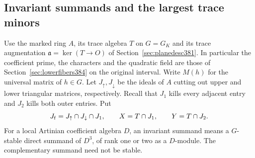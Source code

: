 \documentclass[a4paper,11pt]{article}
\theoremstyle{definition}
\theoremstyle{remark}
\numberwithin{equation}{section}
\begin{document}
\subsection{Invariant summands and the largest trace minors}
\label{sec:flagtraceideals385}

Use the marked ring \(A\), its trace algebra \(T\) on \(G=G_K\)
and its trace augmentation \(\mathfrak a=\ker(T\to O)\) of
Section~\ref{sec:planedesc381}. In particular the coefficient
prime, the characters and the quadratic field are those of
Section~\ref{sec:lowerfibers384} on the original interval.
Write \(M(h)\) for the universal matrix of \(h\in G\).
Let \(J_\uparrow,J_\downarrow\) be the ideals of \(A\) cutting
out upper and lower triangular matrices, respectively.
Recall that \(J_1\) kills every adjacent entry and \(J_2\)
kills both outer entries. Put
\[
 J_{\rm f}=J_\uparrow\cap J_\downarrow\cap J_1,\qquad
 X=T\cap J_1,\qquad Y=T\cap J_2 .
\]
For a local Artinian coefficient algebra \(D\), an invariant
summand means a \(G\)-stable direct summand of \(D^3\), of rank
one or two as a \(D\)-module. The complementary summand need
not be stable.
\end{document}
